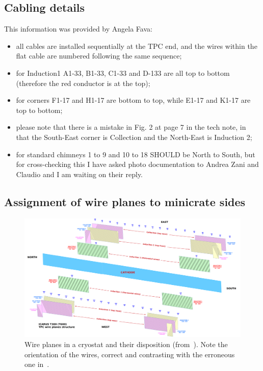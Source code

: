 \documentclass{article}
\begin{document}
\subsection{Cabling details}
\label{ssec:CablingInfo}

This information was provided by Angela Fava:
\begin{itemize}
  \item all cables are installed sequentially at the TPC end, and the wires within the flat cable are numbered following the same sequence;
  \item for Induction1 A1-33, B1-33, C1-33 and D-133 are all top to bottom (therefore the red conductor is at the top);
  \item for corners F1-17 and H1-17 are bottom to top, while E1-17 and K1-17 are top to bottom;
  \item please note that there is a mistake in Fig. 2 at page 7 in the tech note, in that the South-East corner is Collection and the North-East is Induction 2;
  \item for standard chimneys 1 to 9 and 10 to 18 SHOULD be North to South, but for cross-checking this I have asked photo documentation to Andrea Zani and Claudio and I am waiting on their reply.
\end{itemize}


\subsection{Assignment of wire planes to minicrate sides}
\label{ssec:PlaneAssignment}

\begin{figure}[p]
  \centerline{\includegraphics[width=0.8\textheight,angle=90]{figures/Icarus_TPC_wp}}
  \caption{
    Wire planes in a cryostat and their disposition (from~\cite{SBNDocDBxxxx:ConnTest}).
    Note the orientation of the wires, correct and contrasting with the erroneous one in~\cite{SBNDocDB1020}.
    \label{fig:WirePlanesInTPC}
  }
\end{figure}
\end{document}

